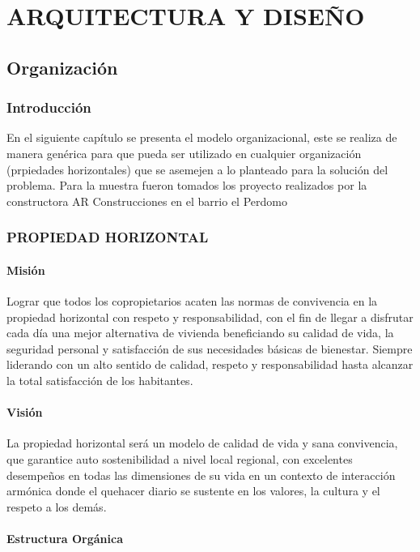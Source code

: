 \chapter{ARQUITECTURA Y DISEÑO}
\section{Organización}
\subsection{Introducción}

En el siguiente capítulo se presenta el modelo organizacional, este se realiza de manera genérica para que pueda ser utilizado en cualquier organización (prpiedades horizontales) que se asemejen a lo planteado para la solución del problema. Para la muestra fueron tomados los proyecto realizados por la constructora AR Construcciones en el barrio el Perdomo

\newpage
\subsection{PROPIEDAD HORIZONTAL}

\subsubsection{Misión}

Lograr que todos los copropietarios acaten las normas de convivencia en la propiedad horizontal con respeto y responsabilidad, con el fin de llegar a disfrutar cada día una mejor alternativa de vivienda beneficiando su calidad de vida, la seguridad personal y satisfacción de sus necesidades básicas de bienestar. Siempre liderando con un alto sentido de calidad, respeto y responsabilidad hasta alcanzar la total satisfacción de los habitantes.

\subsubsection{Visión}

La propiedad horizontal será un modelo de calidad de vida y sana convivencia, que garantice auto sostenibilidad a nivel local regional, con excelentes desempeños en todas las dimensiones de su vida en un contexto de interacción armónica donde el quehacer diario se sustente en los valores, la cultura y el respeto a los demás.


\subsubsection{Estructura Orgánica}


